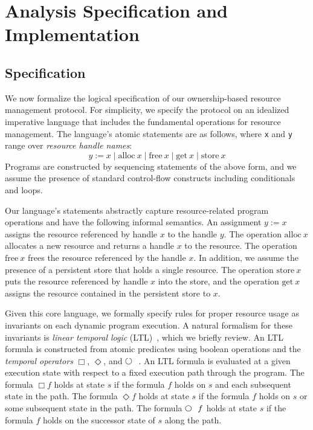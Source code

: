 \section{Analysis Specification and Implementation}
\label{sec:alg}


\subsection{Specification}

We now formalize the logical
specification of our ownership-based resource management protocol.
For simplicity, we specify the protocol on an idealized imperative
language that includes the fundamental operations for resource
management.  The language's atomic statements are as follows, where
{\tt x} and {\tt y} range over {\em resource handle names}:
\[
y := x\mid \mathrm{alloc}\ x \mid \mathrm{free} \ x \mid 
  \mathrm{get}\ x \mid  \mathrm{store}\ x 
%
\]
Programs are constructed by sequencing statements of the above form,
and we assume the presence of standard control-flow constructs
including conditionals and loops.

Our language's statements
abstractly capture resource-related program operations and
have the following informal semantics.
An assignment $y :=  x$ assigns the resource referenced by handle $x$ to the
handle $y$.
The operation $\mathrm{alloc}\ x$ allocates a new resource and returns a handle
$x$ to the resource.
The operation $\mathrm{free}\ x$ frees the resource
referenced by the handle $x$.
In addition, we assume the presence of a persistent store that holds a
single resource.  The operation $\mathrm{store}\ x$ puts the resource
referenced by handle $x$ into the store, and the operation
$\mathrm{get}\ x$ assigns the resource contained in the persistent store
to $x$.

Given this core language, we formally specify rules for proper
resource usage as 
invariants on each dynamic program execution.  A natural formalism for
these invariants is
{\em linear temporal logic} (LTL)~\cite{Emerson90,MannaPnueli92vol1},
which we briefly review.
An LTL formula is constructed from atomic predicates using boolean
operations and the {\em temporal operators} $\Box$, $\Diamond$, 
and $\Next$.
An LTL formula is evaluated at a given execution state
with respect to a fixed execution path through the program.
The formula $\Box f$ holds at state $s$
if the formula $f$ holds on $s$ and each subsequent state in
the path.  
The formula $\Diamond f$ 
holds at state $s$ if the formula $f$ holds on $s$ or some
subsequent state in the path.  
The formula $\Next f$ holds at state
$s$ if the formula $f$ holds on the successor state of $s$ along the
path.


